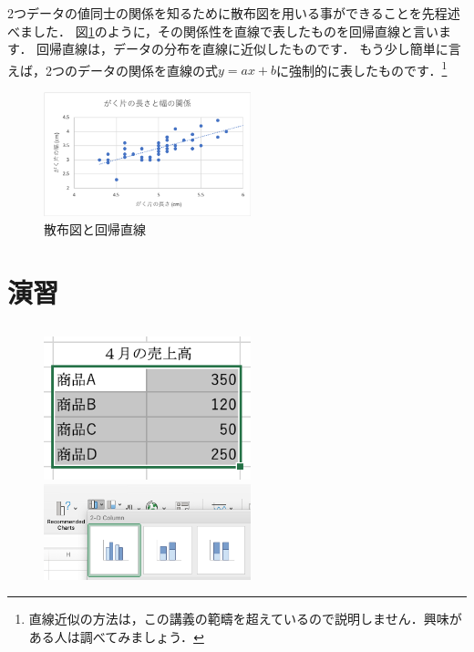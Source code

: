 2つデータの値同士の関係を知るために散布図を用いる事ができることを先程述べました．
図\ref{fig:regression}のように，その関係性を直線で表したものを回帰直線と言います．
回帰直線は，データの分布を直線に近似したものです．
もう少し簡単に言えば，2つのデータの関係を直線の式$y=ax+b$に強制的に表したものです．\footnote{直線近似の方法は，この講義の範疇を超えているので説明しません．興味がある人は調べてみましょう．}

\begin{figure}[htbp]
    \centering
    \includegraphics[width=6cm]{chap2/regression.png}
    \caption{散布図と回帰直線}
    \label{fig:regression}
\end{figure}

\section{演習}

\subsection{}


\begin{figure}[tb]
    \begin{minipage}{0.5\hsize}
        \centering
        \includegraphics[width=6cm]{chap2/bar1.png}
        \caption{}
        \label{fig:bar1}
    \end{minipage}
    \begin{minipage}{0.5\hsize}
        \centering
        \includegraphics[width=6cm]{chap2/bar2.png}
        \caption{}
        \label{fig:bar2}
    \end{minipage}
\end{figure}


